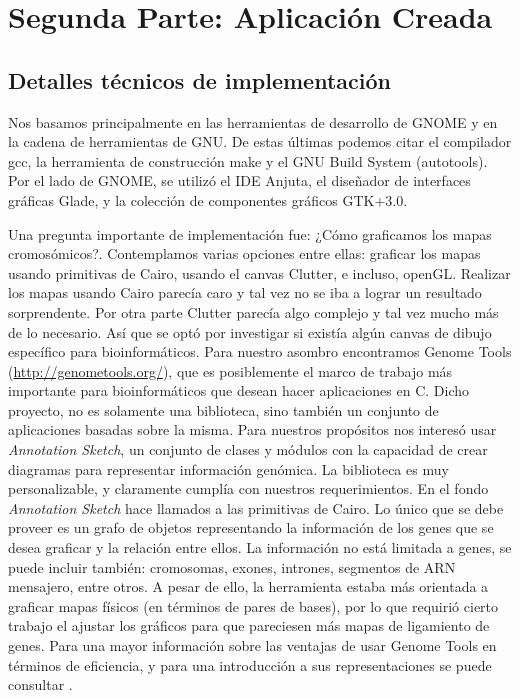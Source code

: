 \documentclass{article}
\begin{document}
	\section{Segunda Parte: Aplicación Creada}
	
	\subsection{Detalles técnicos de implementación}
	
	Nos basamos principalmente en las herramientas de desarrollo de GNOME y en la cadena de herramientas de GNU. De estas últimas podemos citar el compilador gcc, la herramienta de construcción make y el GNU Build System (autotools). Por el lado de GNOME, se utilizó el IDE Anjuta, el diseñador de interfaces gráficas Glade, y la colección de componentes gráficos GTK+3.0.
	
	Una pregunta importante de implementación fue: ¿Cómo graficamos los mapas cromosómicos?. Contemplamos varias opciones entre ellas: graficar los mapas usando primitivas de Cairo, usando el canvas Clutter, e incluso, openGL. Realizar los mapas usando Cairo parecía caro y tal vez no se iba a lograr un resultado sorprendente. Por otra parte Clutter parecía algo complejo y tal vez mucho más de lo necesario. Así que se optó por investigar si existía algún canvas de dibujo específico para bioinformáticos. Para nuestro asombro encontramos Genome Tools (\url{http://genometools.org/}), que es posiblemente el marco de trabajo más importante para bioinformáticos que desean hacer aplicaciones en C. Dicho proyecto, no es solamente una biblioteca, sino también un conjunto de aplicaciones basadas sobre la misma. Para nuestros propósitos nos interesó usar \emph{Annotation Sketch}, un conjunto de clases y módulos con la capacidad de crear diagramas para representar información genómica. La biblioteca es muy personalizable, y claramente cumplía con nuestros requerimientos. En el fondo \emph{Annotation Sketch} hace llamados a las primitivas de Cairo. Lo único que se debe proveer es un grafo de objetos representando la información de los genes que se desea graficar y la relación entre ellos. La información no está limitada a genes, se puede incluir también: cromosomas, exones, intrones, segmentos de ARN mensajero, entre otros. A pesar de ello, la herramienta estaba más orientada a graficar mapas físicos (en términos de pares de bases), por lo que requirió cierto trabajo el ajustar los gráficos para que pareciesen más mapas de ligamiento de genes. Para una mayor información sobre las ventajas de usar Genome Tools en términos de eficiencia, y para una introducción a sus representaciones se puede consultar \cite{gremme2013genometools}.
	
\end{document}
